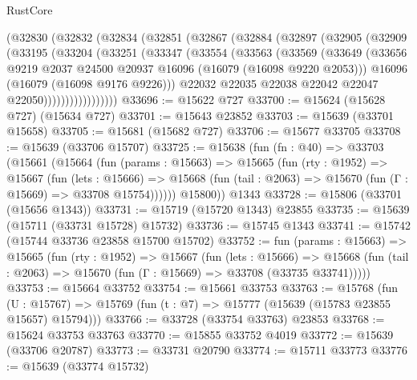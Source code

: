 \begin{lexlean}{RustCore}
\begin{coremodule}
      (@32830
        (@32832
          (@32834
            (@32851
              (@32867
                (@32884
                  (@32897
                    (@32905
                      (@32909
                        (@33195
                          (@33204
                            (@33251
                              (@33347
                                (@33554
                                  (@33563
                                    (@33569
                                      (@33649
                                        (@33656
                                          @9219
                                          @2037
                                          @24500
                                          @20937
                                          @16096
                                          (@16079 (@16098 @9220 @2053)))
                                        @16096
                                        (@16079 (@16098 @9176 @9226)))
                                      @22032
                                      @22035
                                      @22038
                                      @22042
                                      @22047
                                      @22050)))))))))))))))))
@33696 := @15622 @727
@33700 := @15624 (@15628 @727) (@15634 @727)
@33701 := @15643 @23852
@33703 := @15639 (@33701 @15658)
@33705 := @15681 (@15682 @727)
@33706 := @15677 @33705
@33708 := @15639 (@33706 @15707)
@33725 := @15638
    (fun (fn : @40) =>
    @33703
      (@15661
        (@15664
          (fun (params : @15663) =>
          @15665
            (fun (rty : @1952) =>
            @15667
              (fun (lets : @15666) =>
              @15668 (fun (tail : @2063) => @15670 (fun (Γ : @15669) => @33708 @15754))))))
        @15800))
    @1343
@33728 := @15806 (@33701 (@15656 @1343))
@33731 := @15719 (@15720 @1343) @23855
@33735 := @15639 (@15711 (@33731 @15728) @15732)
@33736 := @15745 @1343
@33741 := @15742 (@15744 @33736 @23858 @15700 @15702)
@33752 := fun (params : @15663) =>
  @15665
    (fun (rty : @1952) =>
    @15667
      (fun (lets : @15666) =>
      @15668 (fun (tail : @2063) => @15670 (fun (Γ : @15669) => @33708 (@33735 @33741)))))
@33753 := @15664 @33752
@33754 := @15661 @33753
@33763 := @15768
    (fun (U : @15767) => @15769 (fun (t : @7) => @15777 (@15639 (@15783 @23855 @15657) @15794)))
@33766 := @33728 (@33754 @33763) @23853
@33768 := @15624 @33753 @33763
@33770 := @15855 @33752 @4019
@33772 := @15639 (@33706 @20787)
@33773 := @33731 @20790
@33774 := @15711 @33773
@33776 := @15639 (@33774 @15732)

\end{coremodule}
\end{lexlean}
